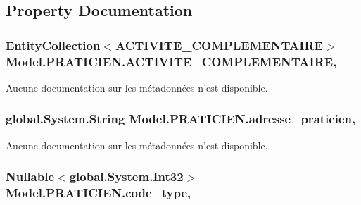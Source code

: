 \subsection{Property Documentation}
\hypertarget{class_model_1_1_p_r_a_t_i_c_i_e_n_af38b58649915c0ec56ae505fe0bec260}{
\subsubsection[{A\-C\-T\-I\-V\-I\-T\-E\-\_\-\-C\-O\-M\-P\-L\-E\-M\-E\-N\-T\-A\-I\-R\-E}]{\setlength{\rightskip}{0pt plus 5cm}Entity\-Collection$<${\bf A\-C\-T\-I\-V\-I\-T\-E\-\_\-\-C\-O\-M\-P\-L\-E\-M\-E\-N\-T\-A\-I\-R\-E}$>$ Model.\-P\-R\-A\-T\-I\-C\-I\-E\-N.\-A\-C\-T\-I\-V\-I\-T\-E\-\_\-\-C\-O\-M\-P\-L\-E\-M\-E\-N\-T\-A\-I\-R\-E\hspace{0.3cm}{\ttfamily [get]}, {\ttfamily [set]}}}\label{class_model_1_1_p_r_a_t_i_c_i_e_n_af38b58649915c0ec56ae505fe0bec260}


Aucune documentation sur les métadonnées n'est disponible. 

\hypertarget{class_model_1_1_p_r_a_t_i_c_i_e_n_af65b1cb99d1ba84d1f1a3c9d4ff96637}{
\subsubsection[{adresse\-\_\-praticien}]{\setlength{\rightskip}{0pt plus 5cm}global.\-System.\-String Model.\-P\-R\-A\-T\-I\-C\-I\-E\-N.\-adresse\-\_\-praticien\hspace{0.3cm}{\ttfamily [get]}, {\ttfamily [set]}}}\label{class_model_1_1_p_r_a_t_i_c_i_e_n_af65b1cb99d1ba84d1f1a3c9d4ff96637}


Aucune documentation sur les métadonnées n'est disponible. 

\hypertarget{class_model_1_1_p_r_a_t_i_c_i_e_n_ab93a1451efbd3e55b088b40837f035b5}{
\subsubsection[{code\-\_\-type}]{\setlength{\rightskip}{0pt plus 5cm}Nullable$<$global.\-System.\-Int32$>$ Model.\-P\-R\-A\-T\-I\-C\-I\-E\-N.\-code\-\_\-type\hspace{0.3cm}{\ttfamily [get]}, {\ttfamily [set]}}}\label{class_model_1_1_p_r_a_t_i_c_i_e_n_ab93a1451efbd3e55b088b40837f035b5}


